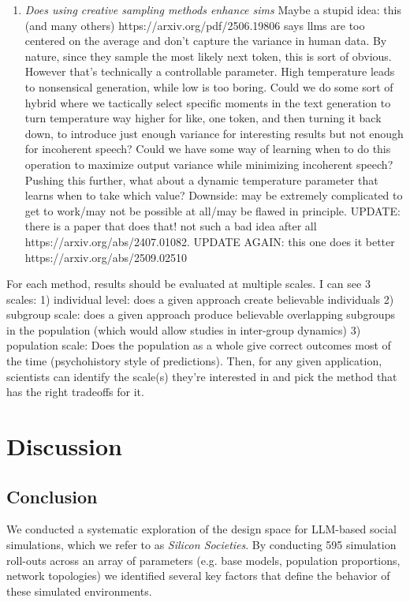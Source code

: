 \documentclass{article} %
\begin{document}
\begin{enumerate}
    \item\textit{Does using creative sampling methods enhance sims} Maybe a stupid idea: this (and many others) https://arxiv.org/pdf/2506.19806 says llms are too centered on the average and don't capture the variance in human data. By nature, since they sample the most likely next token, this is sort of obvious. However that's technically a controllable parameter. High temperature leads to nonsensical generation, while low is too boring. Could we do some sort of hybrid where we tactically select specific moments in the text generation to turn temperature way higher for like, one token, and then turning it back down, to introduce just enough variance for interesting results but not enough for incoherent speech? Could we have some way of learning when to do this operation to maximize output variance while minimizing incoherent speech? Pushing this further, what about a dynamic temperature parameter that learns when to take which value? Downside: may be extremely complicated to get to work/may not be possible at all/may be flawed in principle. UPDATE: there is a paper that does that! not such a bad idea after all https://arxiv.org/abs/2407.01082. UPDATE AGAIN: this one does it better https://arxiv.org/abs/2509.02510
\end{enumerate}

For each method, results should be evaluated at multiple scales. I can see 3 scales: 1) individual level: does a given approach create believable individuals 2) subgroup scale: does a given approach produce believable overlapping subgroups in the population (which would allow studies in inter-group dynamics) 3) population scale: Does the population as a whole give correct outcomes most of the time (psychohistory style of predictions). Then, for any given application, scientists can identify the scale(s) they're interested in and pick the method that has the right tradeoffs for it.
\fi

\section{Discussion}

\subsection{Conclusion}

We conducted a systematic exploration of the design space for LLM-based social simulations, which we refer to as \textit{Silicon Societies}. By conducting 595 simulation roll-outs across an array of parameters (e.g. base models, population proportions, network topologies) we identified several key factors that define the behavior of these simulated environments.
\end{document}

